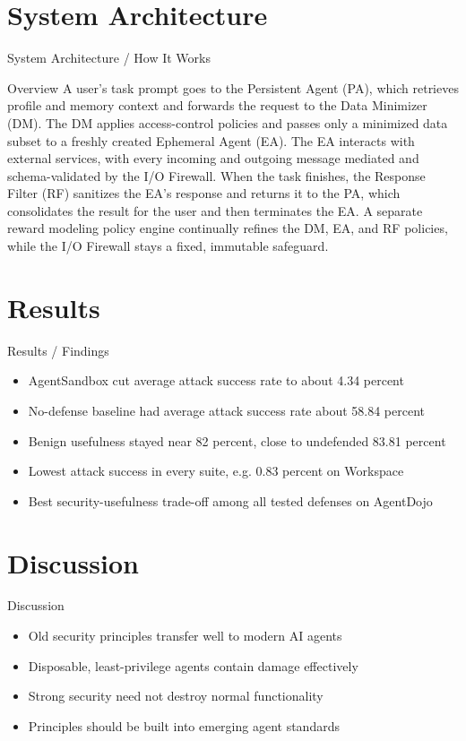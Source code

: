 \documentclass[10pt]{beamer}
\begin{document}
\section{System Architecture}
\begin{frame}{System Architecture / How It Works}
  \begin{block}{Overview}
  A user's task prompt goes to the Persistent Agent (PA), which retrieves profile and memory context and forwards the request to the Data Minimizer (DM). The DM applies access-control policies and passes only a minimized data subset to a freshly created Ephemeral Agent (EA). The EA interacts with external services, with every incoming and outgoing message mediated and schema-validated by the I/O Firewall. When the task finishes, the Response Filter (RF) sanitizes the EA's response and returns it to the PA, which consolidates the result for the user and then terminates the EA. A separate reward modeling policy engine continually refines the DM, EA, and RF policies, while the I/O Firewall stays a fixed, immutable safeguard.
  \end{block}
\end{frame}

\section{Results}
\begin{frame}[allowframebreaks]{Results / Findings}
\begin{itemize}
  \item AgentSandbox cut average attack success rate to about 4.34 percent
  \item No-defense baseline had average attack success rate about 58.84 percent
  \item Benign usefulness stayed near 82 percent, close to undefended 83.81 percent
  \item Lowest attack success in every suite, e.g. 0.83 percent on Workspace
  \item Best security-usefulness trade-off among all tested defenses on AgentDojo
\end{itemize}
\end{frame}

\section{Discussion}
\begin{frame}{Discussion}
\begin{itemize}
  \item Old security principles transfer well to modern AI agents
  \item Disposable, least-privilege agents contain damage effectively
  \item Strong security need not destroy normal functionality
  \item Principles should be built into emerging agent standards
\end{itemize}
\end{frame}
\end{document}

